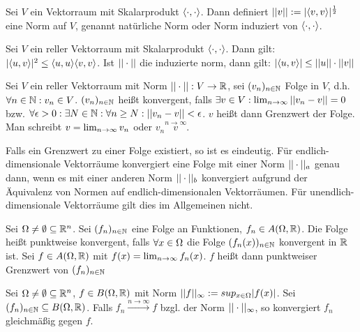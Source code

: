 \begin{definition}
	Sei $V$ ein Vektorraum mit Skalarprodukt $\langle \cdot, \cdot \rangle$. Dann definiert $||v|| := |\langle v, v \rangle|^\frac{1}{2}$ eine Norm auf $V$, genannt natürliche Norm oder Norm induziert von $\langle \cdot, \cdot \rangle$.
\end{definition}

\begin{satz}
	Sei $V$ ein reller Vektorraum mit Skalarprodukt $\langle \cdot, \cdot \rangle$. Dann gilt: $|\langle u, v \rangle|^2 \leq \langle u, u \rangle \langle v, v \rangle$. Ist $|| \cdot ||$ die induzierte norm, dann gilt: $|\langle u, v \rangle| \leq ||u|| \cdot ||v||$
\end{satz}

\begin{definition}
	Sei $V$ ein reller Vektorraum mit Norm $|| \cdot || : V \rightarrow \mathbb{R}$, sei $(v_{n})_{n \in \mathbb{N}}$ Folge in $V$, d.h. $\forall n \in \mathbb{N} : v_n \in V$. $(v_{n})_{n \in \mathbb{N}}$ heißt konvergent, falls $\exists v \in V: \lim_{n \rightarrow \infty} ||v_n - v|| = 0$ bzw. $\forall \epsilon > 0 : \exists N \in \mathbb{N} : \forall n \geq N : ||v_n -v|| < \epsilon$. $v$ heißt dann Grenzwert der Folge. Man schreibt $v = \lim_{n \rightarrow \infty} v_n$ oder $v_n \overset{n \rightarrow \infty}{v}$.
\end{definition}

\begin{satz}
	Falls ein Grenzwert zu einer Folge existiert, so ist es eindeutig. Für endlich-dimensionale Vektorräume konvergiert eine Folge mit einer Norm $|| \cdot ||_a$ genau dann, wenn es mit einer anderen Norm $|| \cdot ||_b$ konvergiert aufgrund der Äquivalenz von Normen auf endlich-dimensionalen Vektorräumen. Für unendlich-dimensionale Vektorräume gilt dies im Allgemeinen nicht.
\end{satz}

\begin{definition}
	Sei $\Omega \neq \emptyset \subseteq \mathbb{R}^n$. Sei $(f_{n})_{n \in \mathbb{N}}$ eine Folge an Funktionen, $f_n \in A(\Omega,\mathbb{R})$. Die Folge heißt punktweise konvergent, falls $\forall x \in \Omega$ die Folge $(f_n(x))_{n \in \mathbb{N}}$ konvergent in $\mathbb{R}$ ist. Sei $f \in A(\Omega,\mathbb{R})$ mit $f(x) = \lim_{n \rightarrow \infty}f_n(x)$. $f$ heißt dann punktweiser Grenzwert von $(f_{n})_{n \in \mathbb{N}}$
\end{definition}

\begin{definition}
	Sei $\Omega \neq \emptyset \subseteq \mathbb{R}^n$, $f \in B(\Omega,\mathbb{R})$ mit Norm $||f||_\infty := sup_{x \in \Omega}|f(x)|$. Sei $(f_{n})_{n \in \mathbb{N}} \subseteq B(\Omega,\mathbb{R})$. Falls $f_n \overset{n \rightarrow \infty}{\rightarrow} f$ bzgl. der Norm $|| \cdot ||_\infty$, so konvergiert $f_n$ gleichmäßig gegen $f$.
\end{definition}

